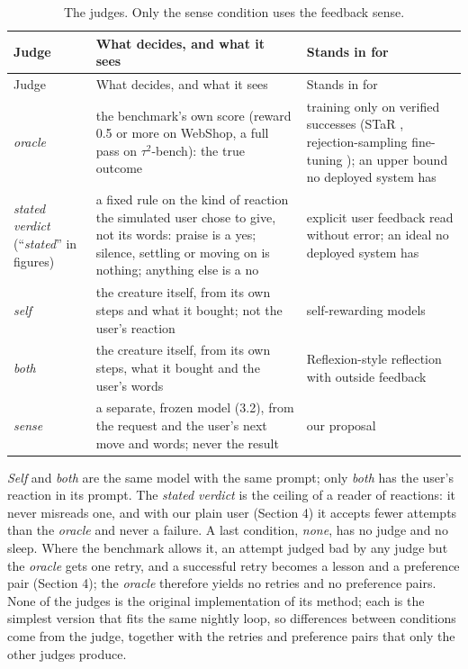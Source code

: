 \begin{longtable}[]{@{}
  >{\raggedright\arraybackslash}p{}
  >{\raggedright\arraybackslash}p{}
  >{\raggedright\arraybackslash}p{}@{}}
\caption{The judges. Only the sense condition uses the feedback sense.}\label{tab:3}\tabularnewline
\toprule\noalign{}
Judge & What decides, and what it sees & Stands in for \\
\midrule\noalign{}
\endfirsthead
\toprule\noalign{}
Judge & What decides, and what it sees & Stands in for \\
\midrule\noalign{}
\endhead
\bottomrule\noalign{}
\endlastfoot
\emph{oracle} & the benchmark's own score (reward 0.5 or more on WebShop, a full pass on $\tau^2$-bench): the true outcome & training only on verified successes (STaR \cite{zelikman2022star}, rejection-sampling fine-tuning \cite{yuan2023scaling}); an upper bound no deployed system has \\
\emph{stated verdict} (``\emph{stated}'' in figures) & a fixed rule on the kind of reaction the simulated user chose to give, not its words: praise is a yes; silence, settling or moving on is nothing; anything else is a no & explicit user feedback read without error; an ideal no deployed system has \\
\emph{self} & the creature itself, from its own steps and what it bought; not the user's reaction & self-rewarding models \cite{yuan2024selfrewarding} \\
\emph{both} & the creature itself, from its own steps, what it bought and the user's words & Reflexion-style reflection with outside feedback \cite{shinn2023reflexion} \\
\emph{sense} & a separate, frozen model (3.2), from the request and the user's next move and words; never the result & our proposal \\
\end{longtable}

\emph{Self} and \emph{both} are the same model with the same prompt; only \emph{both} has the user's reaction in its prompt. The \emph{stated verdict} is the ceiling of a reader of reactions: it never misreads one, and with our plain user (Section 4) it accepts fewer attempts than the \emph{oracle} and never a failure. A last condition, \emph{none}, has no judge and no sleep. Where the benchmark allows it, an attempt judged bad by any judge but the \emph{oracle} gets one retry, and a successful retry becomes a lesson and a preference pair (Section 4); the \emph{oracle} therefore yields no retries and no preference pairs. None of the judges is the original implementation of its method; each is the simplest version that fits the same nightly loop, so differences between conditions come from the judge, together with the retries and preference pairs that only the other judges produce.

